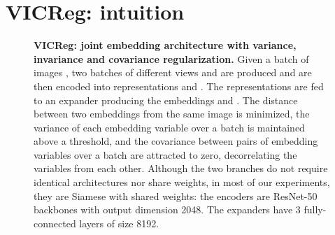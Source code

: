 \documentclass{article}
\newcommand{\algo}{VICReg}
\begin{document}
\section{VICReg: intuition}

\begin{figure}[t]
\centering
\captionsetup[subfigure]{labelformat=empty}
\vspace{-5mm}
\caption{\textbf{\algo: joint embedding architecture with variance, invariance and covariance regularization.} Given a batch of images , two batches of different views  and  are produced and are then encoded into representations  and . The representations are fed to an expander producing the embeddings  and . The distance between two embeddings from the same image is minimized, the variance of each embedding variable over a batch is maintained above a threshold, and the covariance between pairs of embedding variables over a batch are attracted to zero, decorrelating the variables from each other. 
Although the two branches do not require identical architectures nor share weights, in most of our experiments, they are Siamese with shared weights: the encoders are ResNet-50 backbones with output dimension 2048. The expanders have 3 fully-connected layers of size 8192.}
\label{fig:varcov_archi}
\end{figure}
\end{document}
